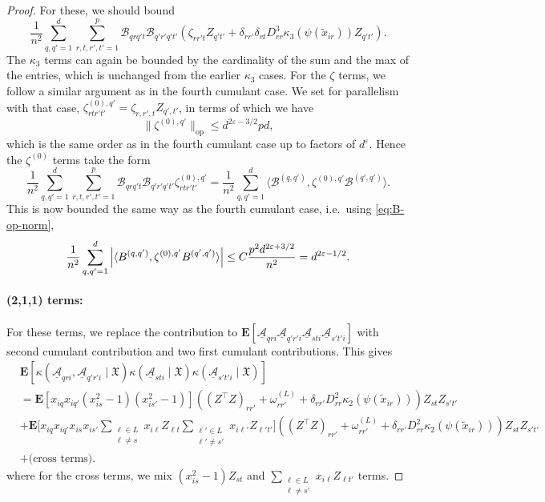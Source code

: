 \documentclass[letterpaper, 10pt, dvipsnames]{article}
\numberwithin{equation}{section}
\newcommand{\Au}{\underline{\mathcal{A}}}
\newcommand{\B}{\mathcal{B}}
\newcommand{\wt}{\widetilde}
\let\O\relax
\newcommand{\O}[1]{\mathcal{O}\left(#1\right)}
\newcommand{\Eb}{\mathbf{E}}
\theoremstyle{definition}
\begin{document}
\begin{proof}
    For these, we should bound 
    \[
      \frac{1}{n^2}\sum_{q,q'=1}^d\sum_{r,t,r',t'=1}^p \B_{qrq't}\B_{q'r'q't'}\left( \zeta_{rr't}Z_{q't'} + \delta_{r r'}\delta_{r t} D_{rr}^3 \kappa_3(\psi(\wt{x}_{ir}))Z_{q't'}\right). 
    \]
    The $\kappa_3$ terms can again be bounded by the cardinality of the sum and the max of the entries, which is unchanged from the earlier $\kappa_3$ cases.  For the $\zeta$ terms, we follow a similar argument as in the fourth cumulant case. We set for parallelism with that case, $\zeta^{(0),q'}_{rtr't'} = \zeta_{r,r',t}Z_{q',t'}$, in terms of which we have 
    \[
    \| \zeta^{(0),q'} \|_{\mathrm{op}} \leq d^{2\varepsilon-3/2} pd,
    \]
    which is the same order as in the fourth cumulant case up to factors of $d^{\varepsilon}$.  Hence the $\zeta^{(0)}$ terms take the form 
    \[
      \frac{1}{n^2}\sum_{q,q'=1}^d\sum_{r,t,r',t'=1}^p \B_{qrq't}\B_{q'r'q't'}\zeta^{(0),q'}_{rtr't'}
      = 
      \frac{1}{n^2}
      \sum_{q,q'=1}^d
      \langle \B^{(q,q')}, \zeta^{(0),q'} \B^{(q',q')} \rangle.
    \]
    This is now bounded the same way as the fourth cumulant case, i.e.\ using \eqref{eq:B-op-norm},
    \[
      \frac{1}{n^2}
      \sum_{q,q'=1}^d
      \left|\langle B^{(q,q')}, \zeta^{(0),q'} B^{(q',q')} \rangle\right|
      \leq C\frac{p^{2} d^{2\varepsilon+3/2}}{n^2} = \O{d^{2\varepsilon-1/2}}.
    \]


    \paragraph{(2,1,1) terms:}
    For these terms, we replace the contribution to $\Eb\left[
      \Au_{qri}\Au_{q'r'i}\Au_{sti}\Au_{s't'i}
      \right]$
    with second cumulant contribution and two first cumulant contributions.  This gives 
    \[
      \begin{aligned}
      &\Eb\left[
        \kappa( \Au_{qri},\Au_{q'r'i} \mid \mathfrak{X})
        \kappa(\Au_{sti} \mid \mathfrak{X})
        \kappa(\Au_{s't'i} \mid \mathfrak{X})
      \right] \\ 
      &= \Eb\left[x_{iq}x_{iq'}(x_{is}^2-1)(x_{is'}^2 - 1) \right] \left( (Z^{\top}Z)_{rr'} + \omega^{(L)}_{rr'} + \delta_{r r'} D_{rr}^2 \kappa_2(\psi(\wt{x}_{ir}))\right)Z_{st} Z_{s't'} \\
      &+ \Eb\biggl[
        x_{iq}x_{iq'}x_{is} x_{is'} 
        \sum_{\substack{\ell \in L \\ \ell \neq s}} x_{i\ell}Z_{\ell t}
        \sum_{\substack{\ell' \in L \\ \ell' \neq s'}} x_{i\ell'}Z_{\ell' t'}
      \biggr] \left( (Z^{\top}Z)_{rr'} + \omega^{(L)}_{rr'} + \delta_{r r'} D_{rr}^2 \kappa_2(\psi(\wt{x}_{ir}))\right) Z_{st} Z_{s't'} \\
      &+ \text{(cross terms)}.
      \end{aligned}
    \]
    where for the cross terms, we mix $(x_{is}^2-1)Z_{st}$ and $\sum_{\substack{\ell \in L \\ \ell \neq s'}} x_{i\ell}Z_{\ell t'}$ terms.


\end{proof}
\end{document}
